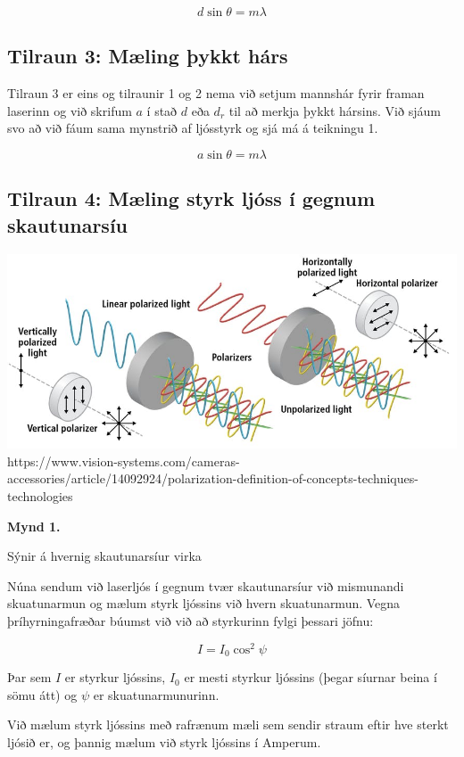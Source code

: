 \documentclass[12pt]{article}
\begin{document}
\[d \sin{\theta} = m\lambda\]

\subsection{Tilraun 3: Mæling þykkt hárs}

Tilraun 3 er eins og tilraunir 1 og 2 nema við setjum mannshár fyrir framan laserinn og við skrifum $a$ í stað $d$ eða $d_r$ til að merkja þykkt hársins. Við sjáum svo að við fáum sama mynstrið af ljósstyrk og sjá má á teikningu 1.

\[a \sin{\theta} = m\lambda\]

\subsection{Tilraun 4: Mæling styrk ljóss í gegnum skautunarsíu}

\begin{center}
    \includegraphics[scale=0.4]{html/polMynd.jpg}
    {\scriptsize https://www.vision-systems.com/cameras-accessories/article/14092924/polarization-definition-of-concepts-techniques-technologies}
    
    \bf Mynd 1.

    {\footnotesize Sýnir á hvernig skautunarsíur virka}
\end{center}

Núna sendum við laserljós í gegnum tvær skautunarsíur við mismunandi skuatunarmun og mælum styrk ljóssins við hvern skuatunarmun. Vegna þríhyrningafræðar búumst við við að styrkurinn fylgi þessari jöfnu:

\[ I = I_0 \cos^2{\psi} \]

Þar sem $I$ er styrkur ljóssins, $I_0$ er mesti styrkur ljóssins (þegar síurnar beina í sömu átt) og $\psi$ er skuatunarmunurinn.

Við mælum styrk ljóssins með rafrænum mæli sem sendir straum eftir hve sterkt ljósið er, og þannig mælum við styrk ljóssins í Amperum.
\end{document}
